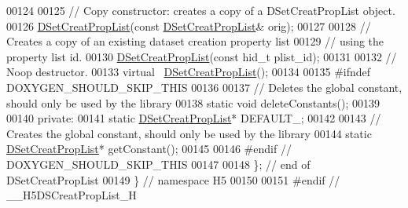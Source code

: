 \begin{DoxyCode}
00124 
00125         \textcolor{comment}{// Copy constructor: creates a copy of a DSetCreatPropList object.}
00126         \hyperlink{class_h5_1_1_d_set_creat_prop_list}{DSetCreatPropList}(\textcolor{keyword}{const} \hyperlink{class_h5_1_1_d_set_creat_prop_list}{DSetCreatPropList}& orig);
00127 
00128         \textcolor{comment}{// Creates a copy of an existing dataset creation property list}
00129         \textcolor{comment}{// using the property list id.}
00130         \hyperlink{class_h5_1_1_d_set_creat_prop_list}{DSetCreatPropList}(\textcolor{keyword}{const} hid\_t plist\_id);
00131 
00132         \textcolor{comment}{// Noop destructor.}
00133         \textcolor{keyword}{virtual} ~\hyperlink{class_h5_1_1_d_set_creat_prop_list}{DSetCreatPropList}();
00134 
00135 \textcolor{preprocessor}{#ifndef DOXYGEN\_SHOULD\_SKIP\_THIS}
00136 
00137         \textcolor{comment}{// Deletes the global constant, should only be used by the library}
00138         \textcolor{keyword}{static} \textcolor{keywordtype}{void} deleteConstants();
00139 
00140     \textcolor{keyword}{private}:
00141         \textcolor{keyword}{static} \hyperlink{class_h5_1_1_d_set_creat_prop_list}{DSetCreatPropList}* DEFAULT\_;
00142 
00143         \textcolor{comment}{// Creates the global constant, should only be used by the library}
00144         \textcolor{keyword}{static} \hyperlink{class_h5_1_1_d_set_creat_prop_list}{DSetCreatPropList}* getConstant();
00145 
00146 \textcolor{preprocessor}{#endif // DOXYGEN\_SHOULD\_SKIP\_THIS}
00147 
00148 \}; \textcolor{comment}{// end of DSetCreatPropList}
00149 \} \textcolor{comment}{// namespace H5}
00150 
00151 \textcolor{preprocessor}{#endif // \_\_H5DSCreatPropList\_H}
\end{DoxyCode}
